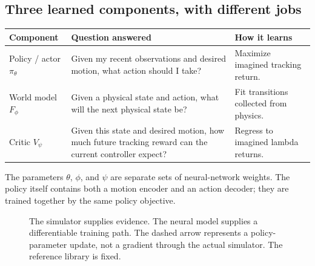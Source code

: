 \documentclass[11pt,a4paper]{article}
\begin{document}
\subsection{Three learned components, with different jobs}
\begin{tabularx}{\linewidth}{@{}lXX@{}}
\toprule
Component & Question answered & How it learns\\
\midrule
Policy / actor $\pi_\theta$ & Given my recent observations and desired motion,
what action should I take? & Maximize imagined tracking return.\\
World model $F_\phi$ & Given a physical state and action, what will the next
physical state be? & Fit transitions collected from physics.\\
Critic $V_\psi$ & Given this state and desired motion, how much future tracking
reward can the current controller expect? & Regress to imagined lambda returns.\\
\bottomrule
\end{tabularx}
The parameters $\theta$, $\phi$, and $\psi$ are separate sets of neural-network
weights. The policy itself contains both a motion encoder and an action decoder;
they are trained together by the same policy objective.

\begin{figure}[htbp]
\centering
{}
\caption{The simulator supplies evidence. The neural model supplies a differentiable
training path. The dashed arrow represents a policy-parameter update, not a
gradient through the actual simulator. The reference library is fixed.}
\end{figure}
\end{document}
